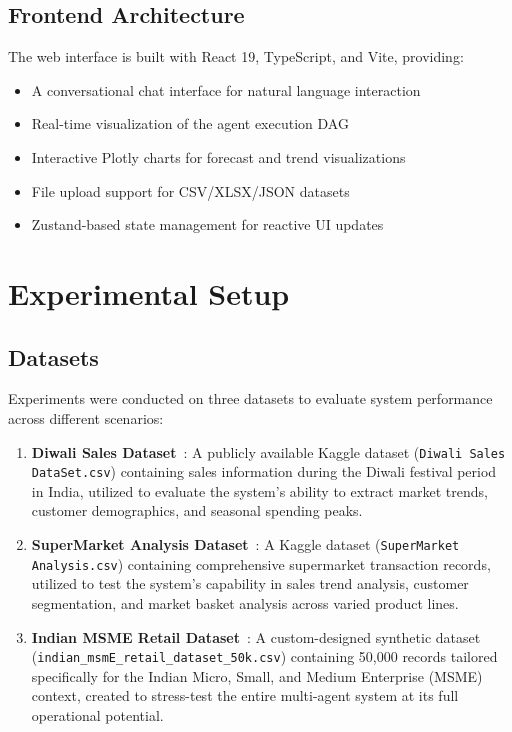 \documentclass[conference]{IEEEtran}
\begin{document}
\subsection{Frontend Architecture}

The web interface is built with React 19, TypeScript, and Vite, providing:

\begin{itemize}
    \item A conversational chat interface for natural language interaction
    \item Real-time visualization of the agent execution DAG
    \item Interactive Plotly charts for forecast and trend visualizations
    \item File upload support for CSV/XLSX/JSON datasets
    \item Zustand-based state management for reactive UI updates
\end{itemize}

\section{Experimental Setup}

\subsection{Datasets}

Experiments were conducted on three datasets to evaluate system performance across different scenarios:

\begin{enumerate}
    \item \textbf{Diwali Sales Dataset}~\cite{diwali_sales}: A publicly available Kaggle dataset (\texttt{Diwali Sales DataSet.csv}) containing sales information during the Diwali festival period in India, utilized to evaluate the system's ability to extract market trends, customer demographics, and seasonal spending peaks.
    
    \item \textbf{SuperMarket Analysis Dataset}~\cite{supermarket_analysis}: A Kaggle dataset (\texttt{SuperMarket Analysis.csv}) containing comprehensive supermarket transaction records, utilized to test the system's capability in sales trend analysis, customer segmentation, and market basket analysis across varied product lines.
    
    \item \textbf{Indian MSME Retail Dataset}~\cite{msme_synthetic}: A custom-designed synthetic dataset (\texttt{indian\_msmE\_retail\_dataset\_50k.csv}) containing 50,000 records tailored specifically for the Indian Micro, Small, and Medium Enterprise (MSME) context, created to stress-test the entire multi-agent system at its full operational potential.
\end{enumerate}
\end{document}
